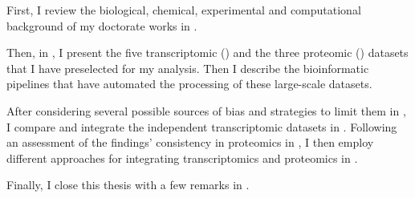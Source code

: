 First, I review the biological, chemical, experimental and computational
background of my doctorate works in .\mybr\

Then, in ,
I present the five transcriptomic (\Rnaseq)
and the three proteomic () datasets
that I have preselected for my analysis.
Then I describe the bioinformatic pipelines
that have automated the processing of these large-scale datasets.\mybr\

After considering several possible sources of bias
and strategies to limit them in ,
I compare and integrate the independent transcriptomic datasets
in .
Following an assessment of the findings' consistency in proteomics
in ,
I then employ different approaches for integrating
transcriptomics and proteomics in .\mybr\

Finally, I close this thesis with a few remarks in .\mybr\

